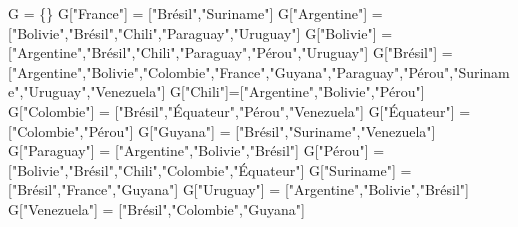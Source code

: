 \documentclass[
  a4paper,
  DIV=11,
  numbers=noendperiod]{scrartcl}
\newenvironment{Shaded}{\begin{snugshade}}{\end{snugshade}}
\newcommand{\NormalTok}[1]{\textcolor[rgb]{0.00,0.23,0.31}{#1}}
\newcommand{\OperatorTok}[1]{\textcolor[rgb]{0.37,0.37,0.37}{#1}}
\newcommand{\StringTok}[1]{\textcolor[rgb]{0.13,0.47,0.30}{#1}}
\begin{document}
\begin{Shaded}
\begin{Highlighting}[]
\NormalTok{G }\OperatorTok{=}\NormalTok{ \{\}}
\NormalTok{G[}\StringTok{"France"}\NormalTok{] }\OperatorTok{=}\NormalTok{ [}\StringTok{"Brésil"}\NormalTok{,}\StringTok{"Suriname"}\NormalTok{]}
\NormalTok{G[}\StringTok{"Argentine"}\NormalTok{] }\OperatorTok{=}\NormalTok{ [}\StringTok{"Bolivie"}\NormalTok{,}\StringTok{"Brésil"}\NormalTok{,}\StringTok{"Chili"}\NormalTok{,}\StringTok{"Paraguay"}\NormalTok{,}\StringTok{"Uruguay"}\NormalTok{]}
\NormalTok{G[}\StringTok{"Bolivie"}\NormalTok{] }\OperatorTok{=}\NormalTok{ [}\StringTok{"Argentine"}\NormalTok{,}\StringTok{"Brésil"}\NormalTok{,}\StringTok{"Chili"}\NormalTok{,}\StringTok{"Paraguay"}\NormalTok{,}\StringTok{"Pérou"}\NormalTok{,}\StringTok{"Uruguay"}\NormalTok{]}
\NormalTok{G[}\StringTok{"Brésil"}\NormalTok{] }\OperatorTok{=}\NormalTok{ [}\StringTok{"Argentine"}\NormalTok{,}\StringTok{"Bolivie"}\NormalTok{,}\StringTok{"Colombie"}\NormalTok{,}\StringTok{"France"}\NormalTok{,}\StringTok{"Guyana"}\NormalTok{,}\StringTok{"Paraguay"}\NormalTok{,}\StringTok{"Pérou"}\NormalTok{,}\StringTok{"Suriname"}\NormalTok{,}\StringTok{"Uruguay"}\NormalTok{,}\StringTok{"Venezuela"}\NormalTok{]}
\NormalTok{G[}\StringTok{"Chili"}\NormalTok{]}\OperatorTok{=}\NormalTok{[}\StringTok{"Argentine"}\NormalTok{,}\StringTok{"Bolivie"}\NormalTok{,}\StringTok{"Pérou"}\NormalTok{]}
\NormalTok{G[}\StringTok{"Colombie"}\NormalTok{] }\OperatorTok{=}\NormalTok{ [}\StringTok{"Brésil"}\NormalTok{,}\StringTok{"Équateur"}\NormalTok{,}\StringTok{"Pérou"}\NormalTok{,}\StringTok{"Venezuela"}\NormalTok{]}
\NormalTok{G[}\StringTok{"Équateur"}\NormalTok{] }\OperatorTok{=}\NormalTok{ [}\StringTok{"Colombie"}\NormalTok{,}\StringTok{"Pérou"}\NormalTok{]}
\NormalTok{G[}\StringTok{"Guyana"}\NormalTok{] }\OperatorTok{=}\NormalTok{ [}\StringTok{"Brésil"}\NormalTok{,}\StringTok{"Suriname"}\NormalTok{,}\StringTok{"Venezuela"}\NormalTok{]}
\NormalTok{G[}\StringTok{"Paraguay"}\NormalTok{] }\OperatorTok{=}\NormalTok{ [}\StringTok{"Argentine"}\NormalTok{,}\StringTok{"Bolivie"}\NormalTok{,}\StringTok{"Brésil"}\NormalTok{]}
\NormalTok{G[}\StringTok{"Pérou"}\NormalTok{] }\OperatorTok{=}\NormalTok{ [}\StringTok{"Bolivie"}\NormalTok{,}\StringTok{"Brésil"}\NormalTok{,}\StringTok{"Chili"}\NormalTok{,}\StringTok{"Colombie"}\NormalTok{,}\StringTok{"Équateur"}\NormalTok{]}
\NormalTok{G[}\StringTok{"Suriname"}\NormalTok{] }\OperatorTok{=}\NormalTok{ [}\StringTok{"Brésil"}\NormalTok{,}\StringTok{"France"}\NormalTok{,}\StringTok{"Guyana"}\NormalTok{]}
\NormalTok{G[}\StringTok{"Uruguay"}\NormalTok{] }\OperatorTok{=}\NormalTok{ [}\StringTok{"Argentine"}\NormalTok{,}\StringTok{"Bolivie"}\NormalTok{,}\StringTok{"Brésil"}\NormalTok{]}
\NormalTok{G[}\StringTok{"Venezuela"}\NormalTok{] }\OperatorTok{=}\NormalTok{ [}\StringTok{"Brésil"}\NormalTok{,}\StringTok{"Colombie"}\NormalTok{,}\StringTok{"Guyana"}\NormalTok{]}
\end{Highlighting}
\end{Shaded}
\end{document}
